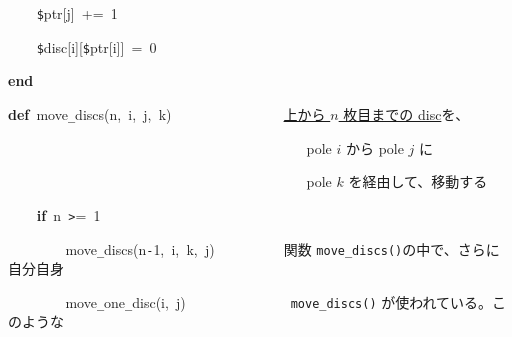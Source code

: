 \documentclass[a4paper,10pt]{article}
\def\mc{\relax}
\begin{document}
\noindent
\mbox{}{\tt\mc \ }{\tt\mc \ }{\tt\mc \ }{\tt\mc \ }{\tt\$}ptr[j]{\tt\mc \ }+={\tt\mc \ }1

\noindent
\mbox{}{\tt\mc \ }{\tt\mc \ }{\tt\mc \ }{\tt\mc \ }{\tt\$}disc[i][{\tt\$}ptr[i]]{\tt\mc \ }={\tt\mc \ }0

\noindent
\mbox{}\textbf{end}

\noindent
\mbox{}\hfill

\noindent
\mbox{}\textbf{def}{\tt\mc \ }move{\tt\_}discs(n,{\tt\mc \ }i,{\tt\mc \ }j,{\tt\mc \ }k){\tt\mc \ }{\tt\mc \ }{\tt\mc \ }{\tt\mc \ }{\tt\mc \ }{\tt\mc \ }{\tt\mc \ }{\tt\mc \ }{\tt\mc \ }{\tt\mc \ }{\tt\mc \ }{\tt\mc \ }{\tt\mc \ }{\tt\mc \ }\rm\mc {\tt\#} \ \underline{\textsf{上から $n$ 枚目までの disc}}を、\hfill 
\tt\mc 

\noindent
\mbox{}{\tt\mc \ }{\tt\mc \ }{\tt\mc \ }{\tt\mc \ }{\tt\mc \ }{\tt\mc \ }{\tt\mc \ }{\tt\mc \ }{\tt\mc \ }{\tt\mc \ }{\tt\mc \ }{\tt\mc \ }{\tt\mc \ }{\tt\mc \ }{\tt\mc \ }{\tt\mc \ }{\tt\mc \ }{\tt\mc \ }{\tt\mc \ }{\tt\mc \ }{\tt\mc \ }{\tt\mc \ }{\tt\mc \ }{\tt\mc \ }{\tt\mc \ }{\tt\mc \ }{\tt\mc \ }{\tt\mc \ }{\tt\mc \ }{\tt\mc \ }{\tt\mc \ }{\tt\mc \ }{\tt\mc \ }{\tt\mc \ }{\tt\mc \ }{\tt\mc \ }{\tt\mc \ }{\tt\mc \ }{\tt\mc \ }{\tt\mc \ }\rm\mc {\tt\#} \ pole $i$ から pole $j$ に\hfill 
\tt\mc 

\noindent
\mbox{}{\tt\mc \ }{\tt\mc \ }{\tt\mc \ }{\tt\mc \ }{\tt\mc \ }{\tt\mc \ }{\tt\mc \ }{\tt\mc \ }{\tt\mc \ }{\tt\mc \ }{\tt\mc \ }{\tt\mc \ }{\tt\mc \ }{\tt\mc \ }{\tt\mc \ }{\tt\mc \ }{\tt\mc \ }{\tt\mc \ }{\tt\mc \ }{\tt\mc \ }{\tt\mc \ }{\tt\mc \ }{\tt\mc \ }{\tt\mc \ }{\tt\mc \ }{\tt\mc \ }{\tt\mc \ }{\tt\mc \ }{\tt\mc \ }{\tt\mc \ }{\tt\mc \ }{\tt\mc \ }{\tt\mc \ }{\tt\mc \ }{\tt\mc \ }{\tt\mc \ }{\tt\mc \ }{\tt\mc \ }{\tt\mc \ }{\tt\mc \ }\rm\mc {\tt\#} \ pole $k$ を経由して、移動する\hfill 
\tt\mc 

\noindent
\mbox{}{\tt\mc \ }{\tt\mc \ }{\tt\mc \ }{\tt\mc \ }\textbf{if}{\tt\mc \ }n{\tt\mc \ }{\tt >}={\tt\mc \ }1

\noindent
\mbox{}{\tt\mc \ }{\tt\mc \ }{\tt\mc \ }{\tt\mc \ }{\tt\mc \ }{\tt\mc \ }{\tt\mc \ }{\tt\mc \ }move{\tt\_}discs(n{\tt -}1,{\tt\mc \ }i,{\tt\mc \ }k,{\tt\mc \ }j){\tt\mc \ }{\tt\mc \ }{\tt\mc \ }{\tt\mc \ }{\tt\mc \ }{\tt\mc \ }{\tt\mc \ }{\tt\mc \ }\rm\mc {\tt\#} \ 関数 {\tt move\_discs()}の中で、さらに自分自身 \hfill 
\tt\mc 

\noindent
\mbox{}{\tt\mc \ }{\tt\mc \ }{\tt\mc \ }{\tt\mc \ }{\tt\mc \ }{\tt\mc \ }{\tt\mc \ }{\tt\mc \ }move{\tt\_}one{\tt\_}disc(i,{\tt\mc \ }j){\tt\mc \ }{\tt\mc \ }{\tt\mc \ }{\tt\mc \ }{\tt\mc \ }{\tt\mc \ }{\tt\mc \ }{\tt\mc \ }{\tt\mc \ }{\tt\mc \ }{\tt\mc \ }{\tt\mc \ }{\tt\mc \ }\rm\mc {\tt\#} \ {\tt move\_discs()} が使われている。このような \hfill 
\tt\mc 
\end{document}
